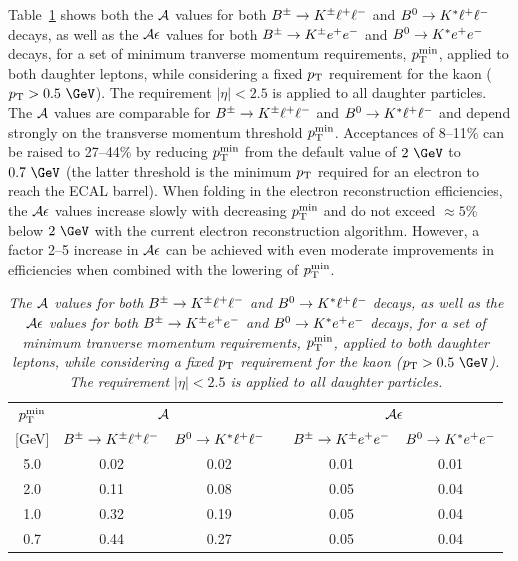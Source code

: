 Table~\ref{tab:ele_acc_x_eff} shows both the $\mathcal{A}$ values for both
$B^{\pm}\to K^{\pm} \ell^+\ell^-$ and $B^0\to K^* \ell^+\ell^-$ decays, as well as the $\mathcal{A}\epsilon$ values for both
$B^{\pm}\to K^{\pm} e^+e^-$ and $B^0\to K^* e^+e^-$ decays, for a set of minimum tranverse momentum
requirements, $p_\mathrm{T}^\mathrm{min}$, applied to both daughter leptons,
while considering a fixed $p_\mathrm{T}$ requirement for the kaon ($\pt >
0.5~\GeV$). The requirement $|\eta| < 2.5$ is applied to all daughter
particles. The $\mathcal{A}$ values are comparable for $B^{\pm}\to K^{\pm} \ell^+\ell^-$ and $B^0\to K^* \ell^+\ell^-$ and
depend strongly on the transverse momentum threshold
$p_\mathrm{T}^\mathrm{min}$. Acceptances of 8--11\% can be raised to 27--44\%
by reducing $p_\mathrm{T}^\mathrm{min}$ from the default value of $2~\GeV$ to
$0.7~\GeV$ (the latter threshold is the minimum $p_\mathrm{T}$ required for an
electron to reach the ECAL barrel). When folding in the electron
reconstruction efficiencies, the $\mathcal{A}\epsilon$ values increase slowly with
decreasing $p_\mathrm{T}^\mathrm{min}$ and do not exceed ${\approx}5\%$ below
$2~\GeV$ with the current electron reconstruction algorithm. However,
a factor 2--5 increase in $\mathcal{A}\epsilon$ can be achieved with even moderate
improvements in efficiencies when combined with the lowering of
$p_\mathrm{T}^\mathrm{min}$.

\begin{table}[!h]
  \footnotesize
  \center
  \caption{\it The $\mathcal{A}$ values for both $B^{\pm}\to K^{\pm} \ell^+\ell^-$ and $B^0\to K^* \ell^+\ell^-$ decays,
    as well as the $\mathcal{A}\epsilon$ values for both $B^{\pm}\to K^{\pm} e^+e^-$ and $B^0\to K^* e^+e^-$ decays,
    for a set of minimum tranverse momentum requirements,
    $p_\mathrm{T}^\mathrm{min}$, applied to both daughter leptons, while
    considering a fixed $p_\mathrm{T}$ requirement for the kaon ($\pt >
    0.5~\GeV$). The requirement $|\eta| < 2.5$ is applied to all
    daughter particles. \label{tab:ele_acc_x_eff}}
  \vspace{0.1in}
  \begin{tabular}{ cccccc }
    \hline
    $p_\mathrm{T}^\mathrm{min}$ & \multicolumn{2}{c}{$\mathcal{A}$} &         & \multicolumn{2}{c}{$\mathcal{A}\epsilon$} \\
    \cline{2-3}\cline{5-6} 
    [GeV]              & $B^{\pm}\to K^{\pm} \ell^+\ell^-$                     & $B^0\to K^* \ell^+\ell^-$ &  & $B^{\pm}\to K^{\pm} e^+e^-$ & $B^0\to K^* e^+e^-$        \\
    \hline                                
    5.0                & 0.02                       & 0.02    &  & 0.01   & 0.01           \\ 
    2.0                & 0.11                       & 0.08    &  & 0.05   & 0.04           \\ 
    1.0                & 0.32                       & 0.19    &  & 0.05   & 0.04           \\ 
    0.7                & 0.44                       & 0.27    &  & 0.05   & 0.04           \\ 
    \hline
  \end{tabular}
\end{table}

